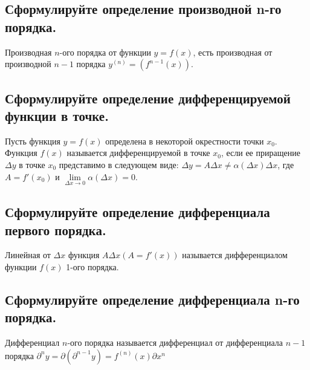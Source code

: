 

\subsection{Сформулируйте определение производной n-го порядка.}

Производная $n$-ого порядка от функции $y = f(x)$, есть производная от производной $n-1$ порядка $y^{(n)} = (f^{n-1}(x))$.



\subsection{Сформулируйте определение дифференцируемой функции в точке.}

Пусть функция $y = f(x)$ определена в некоторой окрестности точки $x_0$. Функция $f(x)$ называется дифференцируемой в точке $x_0$, если ее приращение $\Delta y$ в точке $x_0$ представимо в следующем виде: $\Delta y = A\Delta x \ne \alpha(\Delta x)\Delta x$, где $A = f'(x_0)$ и $\lim\limits_{\Delta x \to 0}\alpha (\Delta x) = 0$.



\subsection{Сформулируйте определение дифференциала первого порядка.}

Линейная от $\Delta x$ функция $A \Delta x (A = f'(x))$ называется дифференциалом функции $f(x)$ 1-ого порядка.



\subsection{Сформулируйте определение дифференциала n-го порядка.}

Дифференциал $n$-ого порядка называется дифференциал от дифференциала $n - 1$ порядка $\partial^ny = \partial(\partial^{n-1}y) = f^{(n)}(x)\partial x^n$


  
